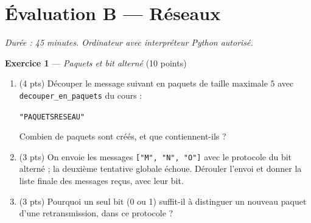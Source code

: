 \section*{Évaluation B --- Réseaux}
\textit{Durée : 45 minutes. Ordinateur avec interpréteur Python autorisé.}


\bigskip

\textbf{Exercice 1} --- \textit{Paquets et bit alterné} \hfill (10 points)

\begin{enumerate}
  \item (4 pts) Découper le message suivant en paquets de taille maximale $5$ avec
  \lstinline{decouper_en_paquets} du cours :
  \begin{center}\lstinline{"PAQUETSRESEAU"}\end{center}
  Combien de paquets sont créés, et que contiennent-ils ?
  \item (3 pts) On envoie les messages \lstinline{["M", "N", "O"]} avec le protocole du bit alterné ; la deuxième tentative globale échoue. Dérouler l'envoi et donner la liste finale des messages reçus, avec leur bit.
  \item (3 pts) Pourquoi un seul bit (0 ou 1) suffit-il à distinguer un nouveau paquet d'une retransmission, dans ce protocole ?
\end{enumerate}


